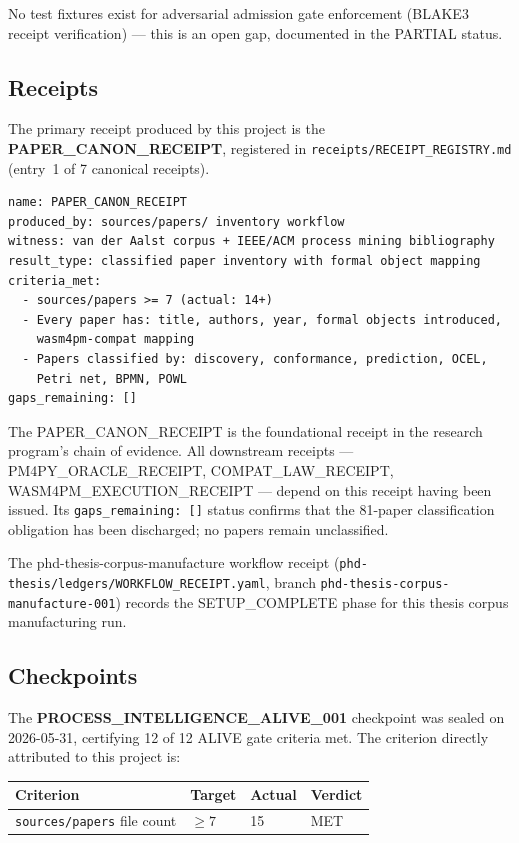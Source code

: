 No test fixtures exist for adversarial admission gate enforcement (BLAKE3
receipt verification) --- this is an open gap, documented in the PARTIAL status.

\subsection{Receipts}
\label{sec:sources-papers-evidence-receipts}

The primary receipt produced by this project is the
\textbf{PAPER\_CANON\_RECEIPT}, registered in
\texttt{receipts/RECEIPT\_REGISTRY.md} (entry~1 of 7 canonical receipts).

\begin{verbatim}
name: PAPER_CANON_RECEIPT
produced_by: sources/papers/ inventory workflow
witness: van der Aalst corpus + IEEE/ACM process mining bibliography
result_type: classified paper inventory with formal object mapping
criteria_met:
  - sources/papers >= 7 (actual: 14+)
  - Every paper has: title, authors, year, formal objects introduced,
    wasm4pm-compat mapping
  - Papers classified by: discovery, conformance, prediction, OCEL,
    Petri net, BPMN, POWL
gaps_remaining: []
\end{verbatim}

The PAPER\_CANON\_RECEIPT is the foundational receipt in the research program's
chain of evidence. All downstream receipts --- PM4PY\_ORACLE\_RECEIPT,
COMPAT\_LAW\_RECEIPT, WASM4PM\_EXECUTION\_RECEIPT --- depend on this receipt
having been issued. Its \texttt{gaps\_remaining: []} status confirms that the
81-paper classification obligation has been discharged; no papers remain
unclassified.

The phd-thesis-corpus-manufacture workflow receipt
(\texttt{phd-thesis/ledgers/WORKFLOW\_RECEIPT.yaml}, branch
\texttt{phd-thesis-corpus-manufacture-001}) records the SETUP\_COMPLETE phase
for this thesis corpus manufacturing run.

\subsection{Checkpoints}
\label{sec:sources-papers-evidence-checkpoints}

The \textbf{PROCESS\_INTELLIGENCE\_ALIVE\_001} checkpoint was sealed on
2026-05-31, certifying 12 of 12 ALIVE gate criteria met. The criterion directly
attributed to this project is:

\begin{center}
\begin{tabular}{llll}
\hline
\textbf{Criterion} & \textbf{Target} & \textbf{Actual} & \textbf{Verdict} \\
\hline
\texttt{sources/papers} file count & $\geq 7$ & 15 & MET \\
\hline
\end{tabular}
\end{center}

